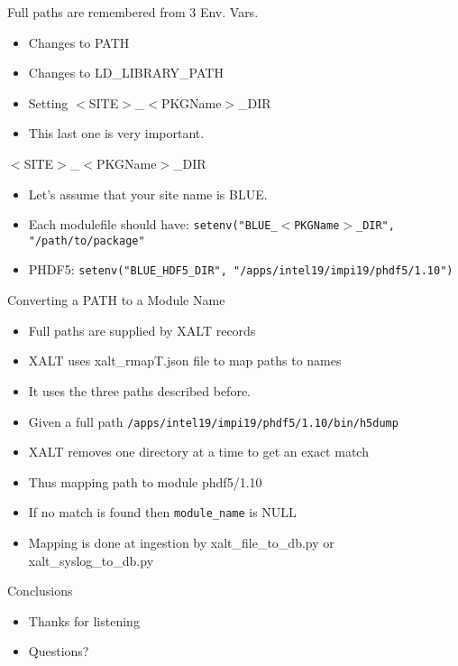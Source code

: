 \documentclass{beamer}
\begin{document}
\begin{frame}{Full paths are remembered from 3 Env. Vars.}
  \begin{itemize}
    \item Changes to PATH
    \item Changes to LD\_LIBRARY\_PATH
    \item Setting $<$SITE$>$\_$<$PKGName$>$\_DIR
    \item This last one is very important.
  \end{itemize}
\end{frame}

\begin{frame}{$<$SITE$>$\_$<$PKGName$>$\_DIR}
  \begin{itemize}
    \item Let's assume that your site name is BLUE.
    \item Each modulefile should have:
      \texttt{setenv("BLUE\_$<$PKGName$>$\_DIR", "/path/to/package"}
    \item PHDF5:     \texttt{setenv("BLUE\_HDF5\_DIR", "/apps/intel19/impi19/phdf5/1.10")}

  \end{itemize}
\end{frame}

\begin{frame}{Converting a PATH to a Module Name}
  \begin{itemize}
    \item Full paths are supplied by XALT records
    \item XALT uses xalt\_rmapT.json file to map paths to names
    \item It uses the three paths described before.
    \item Given a full path \texttt{/apps/intel19/impi19/phdf5/1.10/bin/h5dump}
    \item XALT removes one directory at a time to get an exact match
    \item Thus mapping path to module phdf5/1.10
    \item If no match is found then \texttt{module\_name} is NULL
    \item Mapping is done at ingestion by xalt\_file\_to\_db.py or xalt\_syslog\_to\_db.py
  \end{itemize}
\end{frame}


\begin{frame}{Conclusions}
  \begin{itemize}
    \item Thanks for listening
    \item Questions?
  \end{itemize}
\end{frame}

%
\end{document}
